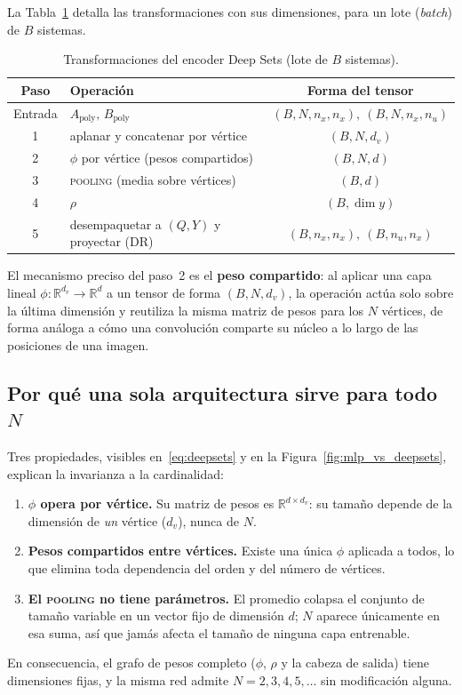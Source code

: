 La Tabla~\ref{tab:transformaciones} detalla las transformaciones con sus dimensiones, para un
lote (\textit{batch}) de $B$ sistemas.

\begin{table}[ht]
\centering
\caption{Transformaciones del encoder Deep Sets (lote de $B$ sistemas).}
\label{tab:transformaciones}
\begin{tabular}{clc}
\toprule
Paso & Operación & Forma del tensor \\
\midrule
Entrada & $A_{\text{poly}},\,B_{\text{poly}}$ & $(B,N,n_x,n_x),\ (B,N,n_x,n_u)$ \\
1 & aplanar y concatenar por vértice & $(B,N,d_v)$ \\
2 & $\phi$ por vértice (pesos compartidos) & $(B,N,d)$ \\
3 & \textsc{pooling} (media sobre vértices) & $(B,d)$ \\
4 & $\rho$ & $(B,\dim y)$ \\
5 & desempaquetar a $(Q,Y)$ y proyectar (DR) & $(B,n_x,n_x),\ (B,n_u,n_x)$ \\
\bottomrule
\end{tabular}
\end{table}

El mecanismo preciso del paso~2 es el \textbf{peso compartido}: al aplicar una capa lineal
$\phi:\mathbb{R}^{d_v}\!\to\!\mathbb{R}^{d}$ a un tensor de forma $(B,N,d_v)$, la operación
actúa solo sobre la última dimensión y reutiliza la misma matriz de pesos para los $N$
vértices, de forma análoga a cómo una convolución comparte su núcleo a lo largo de las
posiciones de una imagen.

\subsection{Por qué una sola arquitectura sirve para todo $N$}
\label{subsec:porque_un_N}

Tres propiedades, visibles en~\eqref{eq:deepsets} y en la Figura~\ref{fig:mlp_vs_deepsets},
explican la invarianza a la cardinalidad:
\begin{enumerate}
    \item \textbf{$\phi$ opera por vértice.} Su matriz de pesos es
    $\mathbb{R}^{d\times d_v}$: su tamaño depende de la dimensión de \emph{un} vértice
    ($d_v$), nunca de $N$.
    \item \textbf{Pesos compartidos entre vértices.} Existe una única $\phi$ aplicada a todos,
    lo que elimina toda dependencia del orden y del número de vértices.
    \item \textbf{El \textsc{pooling} no tiene parámetros.} El promedio colapsa el conjunto de
    tamaño variable en un vector fijo de dimensión $d$; $N$ aparece únicamente en esa suma,
    así que jamás afecta el tamaño de ninguna capa entrenable.
\end{enumerate}
En consecuencia, el grafo de pesos completo ($\phi$, $\rho$ y la cabeza de salida) tiene
dimensiones fijas, y la misma red admite $N = 2,3,4,5,\dots$ sin modificación alguna.

